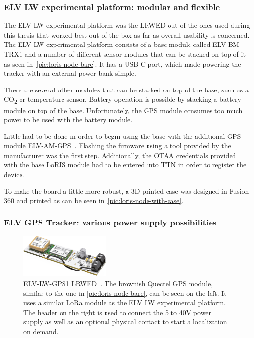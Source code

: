 \subsubsection{ELV LW experimental platform: modular and flexible}\label{subsubsec:elv-lw-experimental-platform}

The ELV LW experimental platform was the \acl{LRWED} out of the ones used during this thesis that worked best out of the box as far as overall usability is concerned.
The ELV LW experimental platform consists of a base module called ELV-BM-TRX1 and a number of different sensor modules that can be stacked on top of it as seen in~\cref{pic:loris-node-bare}\cite{elv_elektronik_ag_elv-lw-base_2023}.
It has a USB-C port, which made powering the tracker with an external power bank simple.

There are several other modules that can be stacked on top of the base, such as a CO\textsubscript{2} or temperature sensor.
Battery operation is possible by stacking a battery module on top of the base.
Unfortunately, the \ac{GPS} module consumes too much power to be used with the battery module.

Little had to be done in order to begin using the base with the additional \ac{GPS} module ELV-AM-GPS~\cite{elv_elektronik_ag_elv-track_2022}.
Flashing the firmware using a tool provided by the manufacturer was the first step.
Additionally, the \ac{OTAA} credentials provided with the base LoRIS module had to be entered into \ac{TTN} in order to register the device.

To make the board a little more robust, a 3D printed case was designed in Fusion 360 and printed as can be seen in~\cref{pic:loris-node-with-case}.

\subsubsection{ELV \acs{GPS} Tracker: various power supply possibilities}\label{subsubsec:elv-gps-tracker-implementation}

\begin{figure}[htbp]
    \centering
    \includegraphics[width=0.4\textwidth]{pictures/hardware/gps-nodes/ELV-LW-GPS1.jpg}
    \caption{
        ELV-LW-GPS1 \acl{LRWED}~\protect\cite{elv_elektronik_ag_elv_2023}.
        The brownish Quectel \ac{GPS} module, similar to the one in \cref{pic:loris-node-bare}, can be seen on the left.
        It uses a similar \ac{LoRa} module as the ELV LW experimental platform.
        The header on the right is used to connect the 5 to 40V power supply as well as an optional physical contact to start a localization on demand.
    }
\end{figure}

